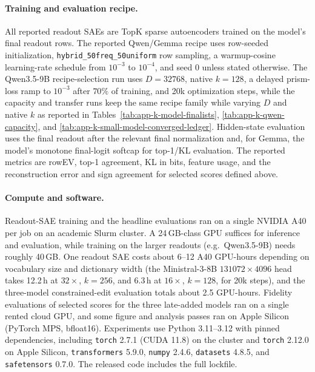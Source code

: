 \paragraph{Training and evaluation recipe.}
\begingroup
\footnotesize
\sloppy
All reported readout SAEs are TopK sparse autoencoders trained on the
model's final readout rows. The reported Qwen/Gemma recipe uses
row-seeded initialization, \texttt{hybrid\_50freq\_50uniform} row sampling, a
warmup-cosine learning-rate schedule from \(10^{-3}\) to \(10^{-4}\), and seed
\(0\) unless stated otherwise. The Qwen3.5-9B recipe-selection run uses
\(D=32768\), native \(k=128\), a delayed prism-loss ramp to \(10^{-3}\) after
\(70\%\) of training, and 20k optimization steps, while the capacity and transfer
runs keep the same recipe family while varying \(D\) and native \(k\) as
reported in Tables~\ref{tab:app-k-model-finalists},
\ref{tab:app-k-qwen-capacity}, and
\ref{tab:app-k-small-model-converged-ledger}.
Hidden-state evaluation uses the
final readout after the relevant final normalization and, for Gemma, the
model's monotone final-logit softcap for top-1/KL evaluation. The reported
metrics are rowEV, top-1 agreement, KL in bits, feature usage, and the
reconstruction error and sign agreement for selected scores defined above.
\endgroup

\paragraph{Compute and software.}
Readout-SAE training and the headline evaluations ran on a single NVIDIA
A40 per job on an academic Slurm cluster. A 24\,GB-class GPU
suffices for inference and evaluation, while training on the larger readouts
(e.g.\ Qwen3.5-9B) needs roughly 40\,GB. One
readout SAE costs about 6--12 A40 GPU-hours depending on vocabulary
size and dictionary width (the Ministral-3-8B \(131072\times4096\) head
takes 12.2\,h at \(32\times\), \(k=256\), and 6.3\,h at \(16\times\),
\(k=128\), for 20k steps), and the three-model constrained-edit evaluation
totals about 2.5 GPU-hours. Fidelity evaluations of selected scores for the
three late-added models ran on a single rented cloud GPU, and some figure
and analysis passes ran on Apple Silicon (PyTorch
MPS, bfloat16). Experiments use Python 3.11--3.12 with pinned
dependencies, including \texttt{torch} 2.7.1 (CUDA 11.8) on the cluster
and \texttt{torch} 2.12.0 on Apple Silicon,
\texttt{transformers} 5.9.0, \texttt{numpy} 2.4.6,
\texttt{datasets} 4.8.5, and \texttt{safetensors} 0.7.0. The released
code includes the full lockfile.

\ReadoutSAEFloatBarrier
